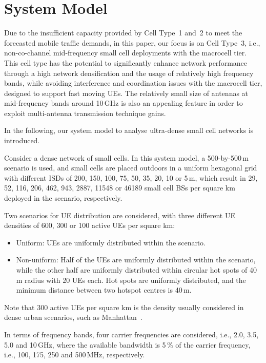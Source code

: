 \documentclass{IEEEtran}
\begin{document}
\section{System Model}
\label{sec:systemModel}

Due to the insufficient capacity provided by Cell Type~1 and~2 to meet the forecasted mobile traffic demands,
in this paper, our focus is on Cell Type~3,
i.e., non-co-channel mid-frequency small cell deployments with the macrocell tier.
This cell type has the potential to significantly enhance network performance through a high network densification and the usage of relatively high frequency bands,
while avoiding interference and coordination issues with the macrocell tier,
designed to support fast moving \acp{UE}.
The relatively small size of antennas at mid-frequency bands around 10\,GHz is also an appealing feature
in order to exploit multi-antenna transmission technique gains.


In the following, our system model to analyse ultra-dense small cell networks is introduced.

Consider a dense network of small cells.
In this system model,
a 500-by-500\,m scenario is used,
and small cells are placed outdoors in a uniform hexagonal grid with different \acp{ISD} of 200, 150, 100, 75, 50, 35, 20, 10 or 5\,m,
which result in 29, 52, 116, 206, 462, 943, 2887, 11548 or 46189 small cell \acp{BS} per square km deployed in the scenario, respectively.


Two scenarios for \ac{UE} distribution are considered,
with three different \ac{UE} densities of 600, 300 or 100 active \acp{UE} per square km:
\begin{itemize}
\item
Uniform: \acp{UE} are uniformly distributed within the scenario.
\item
Non-uniform: Half of the \acp{UE} are uniformly distributed within the scenario,
while the other half are uniformly distributed within circular hot spots of 40\,m radius with 20 \acp{UE} each.
Hot spots are uniformly distributed, and the minimum distance between two hotspot centres is 40\,m.
\end{itemize}
Note that 300 active \acp{UE} per square km is the density usually considered in dense urban scenarios, such as Manhattan~\cite{819497}.

In terms of frequency bands,
four carrier frequencies are considered, i.e., 2.0, 3.5, 5.0 and 10\,GHz,
where the available bandwidth is 5\,\% of the carrier frequency,
i.e., 100, 175, 250 and 500\,MHz, respectively.
\end{document}
